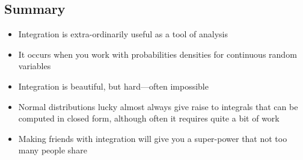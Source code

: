 \begin{slide}
\section[-1]{Summary}

\begin{PauseHighLight}
  \begin{itemize}
  \item Integration is extra-ordinarily useful as a tool of
    analysis\pause
  \item It occurs when you work with probabilities densities for
    continuous random variables\pause
  \item Integration is beautiful, but hard\pause---often
    impossible\pauseb
  \item Normal distributions lucky almost always give raise to
    integrals that can be computed in closed form\pause, although
    often it requires quite a bit of work\pauseb
  \item Making friends with integration will give you a
    super-power that not too many people share\pauseb
  \end{itemize}
\end{PauseHighLight}

\end{slide}


